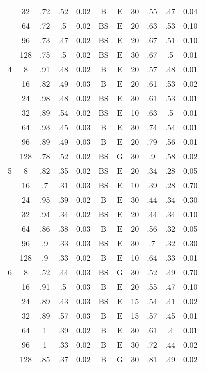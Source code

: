 \begin{table}
\begin{tabular}{|c|c|cccccc||ccc|}
  &  32 &   .72 &  .52 &     0.02 &       B &         E & 30 &   .55 &  .47 & 0.04 \\
  &  64 &   .72 &   .5 &     0.02 &      BS &         E & 20 &   .63 &  .53 & 0.10 \\
  &  96 &   .73 &  .47 &     0.02 &      BS &         E & 20 &   .67 &  .51 & 0.10 \\
  & 128 &   .75 &   .5 &     0.02 &      BS &         E & 30 &   .67 &   .5 & 0.01 \\\hline
4 &   8 &   .91 &  .48 &     0.02 &       B &         E & 20 &   .57 &  .48 & 0.01 \\
  &  16 &   .82 &  .49 &     0.03 &       B &         E & 20 &   .61 &  .53 & 0.02 \\
  &  24 &   .98 &  .48 &     0.02 &      BS &         E & 30 &   .61 &  .53 & 0.01 \\
  &  32 &   .89 &  .54 &     0.02 &      BS &         E & 10 &   .63 &   .5 & 0.01 \\
  &  64 &   .93 &  .45 &     0.03 &       B &         E & 30 &   .74 &  .54 & 0.01 \\
  &  96 &   .89 &  .49 &     0.03 &       B &         E & 20 &   .79 &  .56 & 0.01 \\
  & 128 &   .78 &  .52 &     0.02 &      BS &         G & 30 &    .9 &  .58 & 0.02 \\\hline
5 &   8 &   .82 &  .35 &     0.02 &      BS &         E & 20 &   .34 &  .28 & 0.05 \\
  &  16 &    .7 &  .31 &     0.03 &      BS &         E & 10 &   .39 &  .28 & 0.70 \\
  &  24 &   .95 &  .39 &     0.02 &       B &         E & 30 &   .44 &  .34 & 0.30 \\
  &  32 &   .94 &  .34 &     0.02 &      BS &         E & 20 &   .44 &  .34 & 0.10 \\
  &  64 &   .86 &  .38 &     0.03 &       B &         E & 20 &   .56 &  .32 & 0.05 \\
  &  96 &    .9 &  .33 &     0.03 &      BS &         E & 30 &    .7 &  .32 & 0.30 \\
  & 128 &    .9 &  .33 &     0.02 &       B &         E & 10 &   .64 &  .33 & 0.01 \\\hline
6 &   8 &   .52 &  .44 &     0.03 &      BS &         G & 30 &   .52 &  .49 & 0.70 \\
  &  16 &   .91 &   .5 &     0.03 &       B &         E & 20 &   .55 &  .47 & 0.10 \\
  &  24 &   .89 &  .43 &     0.03 &      BS &         E & 15 &   .54 &  .41 & 0.02 \\
  &  32 &   .89 &  .57 &     0.03 &       B &         E & 15 &   .57 &  .45 & 0.01 \\
  &  64 &     1 &  .39 &     0.02 &       B &         E & 30 &   .61 &   .4 & 0.01 \\
  &  96 &     1 &  .33 &     0.02 &       B &         E & 30 &   .72 &  .44 & 0.02 \\
  & 128 &   .85 &  .37 &     0.02 &       B &         G & 30 &   .81 &  .49 & 0.02 \\\hline
\end{tabular}
\end{table}
